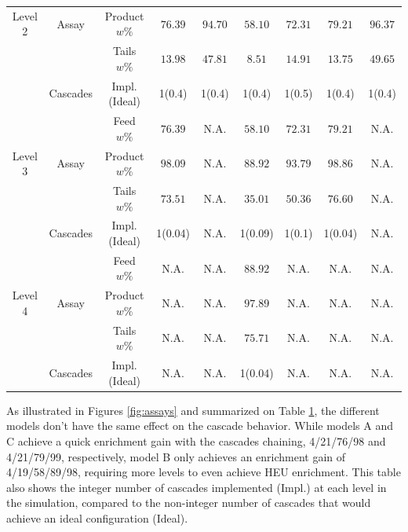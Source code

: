 \begin{table}[h!]
{\begin{tabular*}{\linewidth}{c @{\extracolsep{\fill}} cccccccc}
Level 2 & Assay      & Product $w\%$  & $76.39$  & $94.70$  & $58.10$  & $72.31$  & $79.21$  & $96.37$ \\
        &            & Tails $w\%$    & $13.98$  & $47.81$  & $8.51$   & $14.91$  & $13.75$  & $49.65$ \\
        & Cascades   & Impl. (Ideal)  & 1(0.4)   & 1(0.4)   & 1(0.4)   & 1(0.5)   & 1(0.4)   & 1(0.4)   \\
\midrule                                                                                                 
        &            & Feed $w\%$     & $76.39$  & N.A.     & $58.10$  & $72.31$  & $79.21$  & N.A.      \\
Level 3 & Assay      & Product $w\%$  & $98.09$  & N.A.     & $88.92$  & $93.79$  & $98.86$  & N.A.      \\
        &            & Tails $w\%$    & $73.51$  & N.A.     & $35.01$  & $50.36$  & $76.60$  & N.A.      \\
        & Cascades   & Impl. (Ideal)  & 1(0.04)  & N.A.     & 1(0.09)  & 1(0.1)   & 1(0.04)  & N.A.      \\
\midrule                                                                                                 
        &            & Feed $w\%$     & N.A.     & N.A.     & $88.92$  & N.A.     & N.A.     & N.A.      \\
Level 4 & Assay      & Product $w\%$  & N.A.     & N.A.     & $97.89$  & N.A.     & N.A.     & N.A.      \\
        &            & Tails $w\%$    & N.A.     & N.A.     & $75.71$  & N.A.     & N.A.     & N.A.      \\
        & Cascades   & Impl. (Ideal)  & N.A.     & N.A.     & 1(0.04)  & N.A.     & N.A.     & N.A.      \\
\bottomrule
\end{tabular*}
}
\label{tab:level}
\end{table}

As illustrated in Figures \ref{fig:assays} and summarized on Table
\ref{tab:level}, the different models don't have the same effect on the
cascade behavior. While models A and C achieve a quick enrichment gain with
the cascades chaining, 4/21/76/98 and 4/21/79/99, respectively, model B only
achieves an enrichment gain of 4/19/58/89/98, requiring more levels to even
achieve HEU enrichment. This table also shows the integer
number of cascades implemented (Impl.) at each level in the simulation, compared
to the non-integer number of cascades that would achieve an ideal configuration (Ideal).


